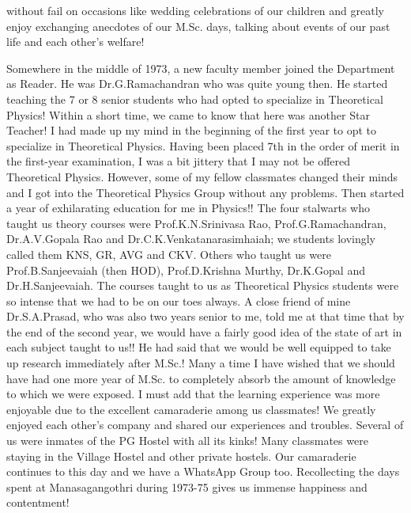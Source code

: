 without fail on occasions like wedding celebrations of our children and greatly enjoy exchanging anecdotes of our M.Sc. days, talking about events of our past life and each other's welfare!

Somewhere in the middle of 1973, a new faculty member joined the Department as Reader. He was Dr.G.Ramachandran who was quite young then. He started teaching the 7 or 8 senior students who had opted to specialize in Theoretical Physics! Within a short time, we came to know that here was another Star Teacher! I had made up my mind in the beginning of the first year to opt to specialize in Theoretical Physics. Having been placed 7th in the order of merit in the first-year examination, I was a bit jittery that I may not be offered Theoretical Physics. However, some of my fellow classmates changed their minds and I got into the Theoretical Physics Group without any problems. Then started a year of exhilarating education for me in Physics!! The four stalwarts who taught us theory courses were Prof.K.N.Srinivasa Rao, Prof.G.Ramachandran, Dr.A.V.Gopala Rao and Dr.C.K.Venkatanarasimhaiah; we students lovingly called them KNS, GR, AVG and CKV. Others who taught us were Prof.B.Sanjeevaiah (then HOD), Prof.D.Krishna Murthy, Dr.K.Gopal and Dr.H.Sanjeevaiah. The courses taught to us as Theoretical Physics students were so intense that we had to be on our toes always. A close friend of mine Dr.S.A.Prasad, who was also two years senior to me, told me at that time that by the end of the second year, we would have a fairly good idea of the state of art in each subject taught to us!! He had said that we would be well equipped to take up research immediately after M.Sc.! Many a time I have wished that we should have had one more year of M.Sc. to completely absorb the amount of knowledge to which we were exposed. I must add that the learning experience was more enjoyable due to the excellent camaraderie among us classmates! We greatly enjoyed each other's company and shared our experiences and troubles. Several of us were inmates of the PG Hostel with all its kinks! Many classmates were staying in the Village Hostel and other private hostels. Our camaraderie continues to this day and we have a WhatsApp Group too. Recollecting the days spent at Manasagangothri during 1973-75 gives us immense happiness and contentment!

